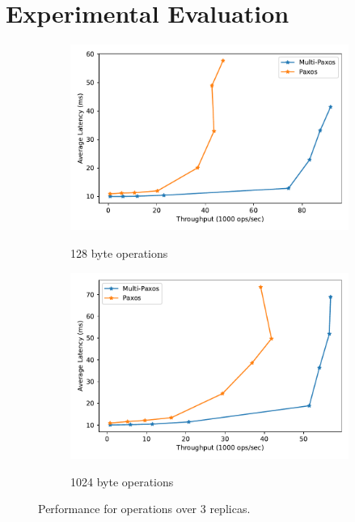 \documentclass[sigconf]{acmart}
\begin{document}

\section{Experimental Evaluation}

\begin{figure}[htp]
    
\begin{subfigure}{\linewidth}
    \centering
    \caption{128 byte operations}
    \includegraphics[width=\textwidth]{3R_128B.pdf}
    \label{fig:3replicas-128}
\end{subfigure}

\begin{subfigure}{\linewidth}
    \centering
    \caption{1024 byte operations}
    \includegraphics[width=\textwidth]{3R_1024B.pdf}
    \label{fig:3replicas-1024}
\end{subfigure}

\caption{Performance for operations over 3 replicas.}
\label{fig:3replicas}

\end{figure}
\end{document}

